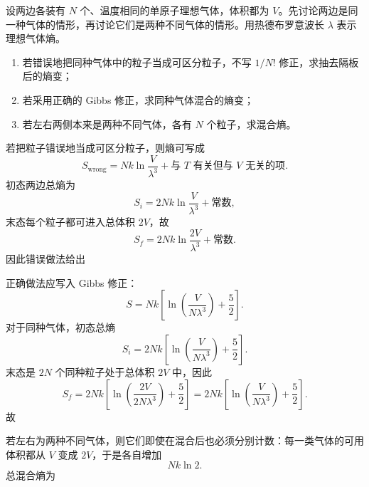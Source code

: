 \begin{question}[18分]
设两边各装有 $N$ 个、温度相同的单原子理想气体，体积都为 $V$。先讨论两边是同一种气体的情形，再讨论它们是两种不同气体的情形。用热德布罗意波长 $\lambda$ 表示理想气体熵。
\begin{enumerate}[label=（\arabic*）,leftmargin=2.8em,itemsep=0.2em]
\item 若错误地把同种气体中的粒子当成可区分粒子，不写 $1/N!$ 修正，求抽去隔板后的熵变；
\item 若采用正确的 Gibbs 修正，求同种气体混合的熵变；
\item 若左右两侧本来是两种不同气体，各有 $N$ 个粒子，求混合熵。
\end{enumerate}
\begin{solution}

若把粒子错误地当成可区分粒子，则熵可写成
\[
S_{\mathrm{wrong}}=Nk\ln\frac{V}{\lambda^3}+\text{与 }T\text{ 有关但与 }V\text{ 无关的项}.
\]
初态两边总熵为
\[
S_i=2Nk\ln\frac{V}{\lambda^3}+\text{常数},
\]
末态每个粒子都可进入总体积 $2V$，故
\[
S_f=2Nk\ln\frac{2V}{\lambda^3}+\text{常数}.
\]
因此错误做法给出

正确做法应写入 Gibbs 修正：
\[
S=Nk\left[\ln\!\left(\frac{V}{N\lambda^3}\right)+\frac52\right].
\]
对于同种气体，初态总熵
\[
S_i=2Nk\left[\ln\!\left(\frac{V}{N\lambda^3}\right)+\frac52\right].
\]
末态是 $2N$ 个同种粒子处于总体积 $2V$ 中，因此
\[
S_f=2Nk\left[\ln\!\left(\frac{2V}{2N\lambda^3}\right)+\frac52\right]
=2Nk\left[\ln\!\left(\frac{V}{N\lambda^3}\right)+\frac52\right].
\]
故

若左右为两种不同气体，则它们即使在混合后也必须分别计数：每一类气体的可用体积都从 $V$ 变成 $2V$，于是各自增加
\[
Nk\ln 2.
\]
总混合熵为
\end{solution}
\end{question}

